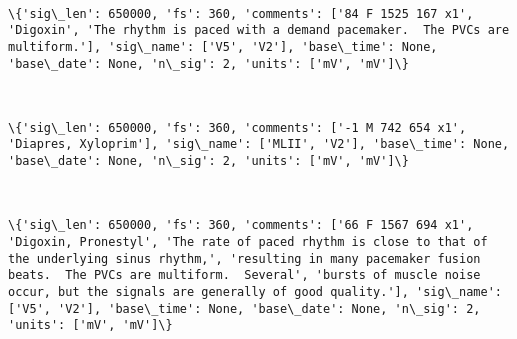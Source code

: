 \documentclass[11pt]{article}
\begin{document}
    \begin{center}
    \end{center}
    { \hspace*{\fill} \\}
    
    \begin{Verbatim}[commandchars=\\\{\}]
\{'sig\_len': 650000, 'fs': 360, 'comments': ['84 F 1525 167 x1', 'Digoxin', 'The rhythm is paced with a demand pacemaker.  The PVCs are multiform.'], 'sig\_name': ['V5', 'V2'], 'base\_time': None, 'base\_date': None, 'n\_sig': 2, 'units': ['mV', 'mV']\}

    \end{Verbatim}

    \begin{center}
    \end{center}
    { \hspace*{\fill} \\}
    
    \begin{Verbatim}[commandchars=\\\{\}]
\{'sig\_len': 650000, 'fs': 360, 'comments': ['-1 M 742 654 x1', 'Diapres, Xyloprim'], 'sig\_name': ['MLII', 'V2'], 'base\_time': None, 'base\_date': None, 'n\_sig': 2, 'units': ['mV', 'mV']\}

    \end{Verbatim}

    \begin{center}
    \end{center}
    { \hspace*{\fill} \\}
    
    \begin{Verbatim}[commandchars=\\\{\}]
\{'sig\_len': 650000, 'fs': 360, 'comments': ['66 F 1567 694 x1', 'Digoxin, Pronestyl', 'The rate of paced rhythm is close to that of the underlying sinus rhythm,', 'resulting in many pacemaker fusion beats.  The PVCs are multiform.  Several', 'bursts of muscle noise occur, but the signals are generally of good quality.'], 'sig\_name': ['V5', 'V2'], 'base\_time': None, 'base\_date': None, 'n\_sig': 2, 'units': ['mV', 'mV']\}

    \end{Verbatim}
\end{document}
